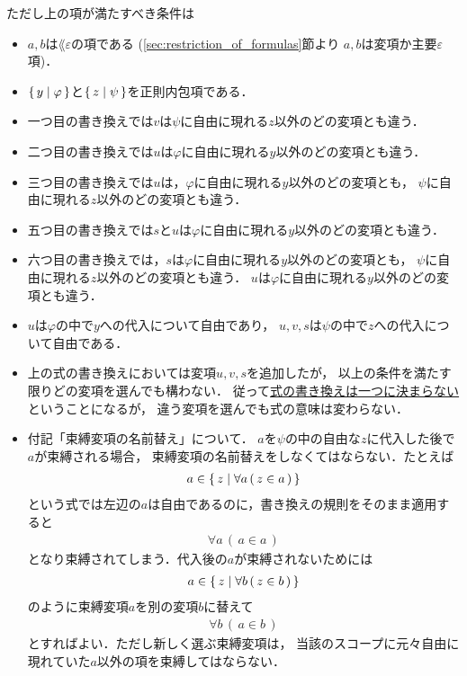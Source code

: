 	ただし上の項が満たすべき条件は
	\begin{itemize}
		\item $a,b$は$\lang{\varepsilon}$の項である
			(\ref{sec:restriction_of_formulas}節より
			$a,b$は変項か主要$\varepsilon$項)．
		
		\item $\{\, y \mid \varphi\, \}$と$\{\, z \mid \psi\, \}$を正則内包項である．
		
		\item 一つ目の書き換えでは$v$は$\psi$に自由に現れる$z$以外のどの変項とも違う．
		
		\item 二つ目の書き換えでは$u$は$\varphi$に自由に現れる$y$以外のどの変項とも違う．
		
		\item 三つ目の書き換えでは$u$は，$\varphi$に自由に現れる$y$以外のどの変項とも，
			$\psi$に自由に現れる$z$以外のどの変項とも違う．
		
		\item 五つ目の書き換えでは$s$と$u$は$\varphi$に自由に現れる$y$以外のどの変項とも違う．
		
		\item 六つ目の書き換えでは，$s$は$\varphi$に自由に現れる$y$以外のどの変項とも，
			$\psi$に自由に現れる$z$以外のどの変項とも違う．
			$u$は$\varphi$に自由に現れる$y$以外のどの変項とも違う．
			
		\item $u$は$\varphi$の中で$y$への代入について自由であり，
			$u,v,s$は$\psi$の中で$z$への代入について自由である．
			
		\item 上の式の書き換えにおいては変項$u,v,s$を追加したが，
			以上の条件を満たす限りどの変項を選んでも構わない．
			従って\underline{式の書き換えは一つに決まらない}ということになるが，
			違う変項を選んでも式の意味は変わらない．
			
		\item 付記「束縛変項の名前替え」について．
			$a$を$\psi$の中の自由な$z$に代入した後で$a$が束縛される場合，
			束縛変項の名前替えをしなくてはならない．たとえば
			\begin{align}
				a \in \{\, z \mid \forall a\, (\, z \in a\, )\, \}
			\end{align}
			という式では左辺の$a$は自由であるのに，書き換えの規則をそのまま適用すると
			\begin{align}
				\forall a\, (\, a \in a\, )
			\end{align}
			となり束縛されてしまう．代入後の$a$が束縛されないためには
			\begin{align}
				a \in \{\, z \mid \forall b\, (\, z \in b\, )\, \}
			\end{align}
			のように束縛変項$a$を別の変項$b$に替えて
			\begin{align}
				\forall b\, (\, a \in b\, )
			\end{align}
			とすればよい．ただし新しく選ぶ束縛変項は，
			当該のスコープに元々自由に現れていた$a$以外の項を束縛してはならない．
	\end{itemize}
	
